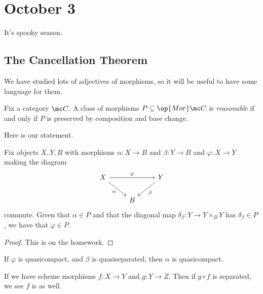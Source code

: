 \documentclass[../notes.tex]{subfiles}
\begin{document}
\section{October 3}

It's spooky season.

\subsection{The Cancellation Theorem}
We have studied lots of adjectives of morphisms, so it will be useful to have some language for them.
\begin{definition}[Reasonable]
	Fix a category $\mc C$. A class of morphisms $P\subseteq\op{Mor}\mc C$ is \textit{reasonable} if and only if $P$ is preserved by composition and base change.
\end{definition}
Here is our statement.
\begin{theorem}
	Fix objects $X,Y,B$ with morphisms $\alpha\colon X\to B$ and $\beta\colon Y\to B$ and $\varphi\colon X\to Y$ making the diagram
	\[\begin{tikzcd}
		X && Y \\
		& B
		\arrow["\varphi", from=1-1, to=1-3]
		\arrow["\alpha"', from=1-1, to=2-2]
		\arrow["\beta", from=1-3, to=2-2]
	\end{tikzcd}\]
	commute. Given that $\alpha\in P$ and that the diagonal map $\delta_\beta\colon Y\to Y\times_BY$ has $\delta_\beta\in P$, we have that $\varphi\in P$.
\end{theorem}
\begin{proof}
	This is on the homework.
\end{proof}
\begin{example}
	If $\varphi$ is quasicompact, and $\beta$ is quasiseparated, then $\alpha$ is quasicompact.
\end{example}
\begin{lemma} \label{lem:cancel-sep}
	If we have scheme morphisms $f\colon X\to Y$ and $g\colon Y\to Z$. Then if $g\circ f$ is separated, we see $f$ is as well.
\end{lemma}
\end{document}
